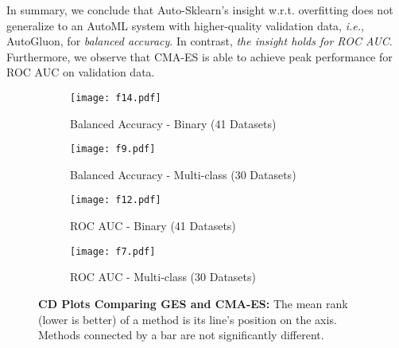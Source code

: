 \documentclass[11pt]{article}
\newcommand{\nbc}[3]{
		{\colorbox{#3}{\bfseries\sffamily\scriptsize\textcolor{white}{#1}}}
		{\textcolor{#3}{\sf\small$\blacktriangleright$\textit{#2}$\blacktriangleleft$}}
}
\newcommand{\changed}[1]{\nbc{CHANGED}{#1}{changedcolor}}
\renewcommand{\changed}[1]{{\color{changedcolor}#1}}
\renewcommand{\changed}[1]{{#1}}
\begin{document}
In summary, we conclude that Auto-Sklearn's insight w.r.t. overfitting does not generalize to an AutoML system with higher-quality validation data, \emph{i.e.}, AutoGluon, for \emph{balanced accuracy}. 
In contrast, \emph{the insight holds for ROC AUC}. 
Furthermore, we observe that CMA-ES is able to achieve peak performance for ROC AUC on validation data. 

\begin{figure}
    \begin{subfigure}[t]{0.49\linewidth}
        \centering 
        \texttt{[image: f14.pdf]}
        \caption{Balanced Accuracy - Binary (41 Datasets)}
        \label{fig/cd_plot/bacc_b}
    \end{subfigure}
    \begin{subfigure}[t]{0.49\linewidth}
        \centering
        \texttt{[image: f9.pdf]}
        \caption{Balanced Accuracy - Multi-class (30 Datasets)}
        \label{fig/cd_plot/bacc_m}
    \end{subfigure}
    \begin{subfigure}[t]{0.49\linewidth}
        \centering
        \texttt{[image: f12.pdf]}
        \caption{ROC AUC - Binary (41 \changed{Datasets})}
        \label{fig/cd_plot/roc_b}
    \end{subfigure}
    \begin{subfigure}[t]{0.49\linewidth}
        \centering
        \texttt{[image: f7.pdf]}
        \caption{ROC AUC - Multi-class (30 \changed{Datasets})}
    \label{fig/cd_plot/roc_m}
    \end{subfigure}

  
    \caption{\textbf{CD Plots Comparing GES and CMA-ES:}
    {\normalfont The mean rank (lower is better) of a method is its line's position on the axis. Methods connected by a bar are not significantly different.}
    }
    \label{fig/cd_plot}
\end{figure}

\begin{table}[b]
\caption{Mean rank change from validation to test data for CMA-ES compared to GES and SingleBest.}\label{table/rank_change}
\centering
{}
\end{table}
\end{document}
